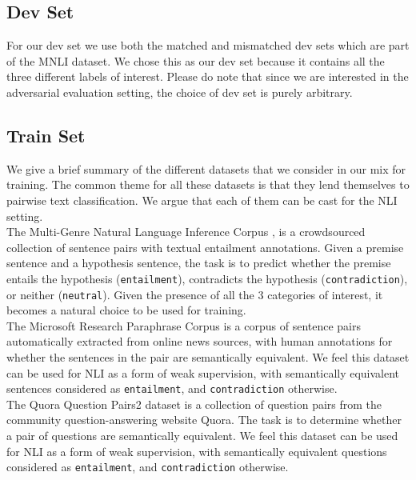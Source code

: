 \subsection{Dev Set}
\label{subsec:devset}

For our dev set we use both the matched and mismatched dev sets which are part of the MNLI dataset. We chose this as our dev set because it contains all the three different labels of interest. Please do note that since we are interested in the adversarial evaluation setting, the choice of dev set is purely arbitrary. 

\subsection{Train Set}
\label{subsec:trainset}

We give a brief summary of the different datasets that we consider in our mix for training. The common theme for all these datasets is that they lend themselves to pairwise text classification. We argue that each of them can be cast for the NLI setting. \\

  The Multi-Genre Natural Language Inference Corpus \cite{N18-1101}, is a crowdsourced collection of sentence pairs with textual entailment annotations. Given a premise sentence and a hypothesis sentence, the task is to predict whether the premise entails the hypothesis (\texttt{entailment}), contradicts the hypothesis (\texttt{contradiction}), or neither (\texttt{neutral}). Given the presence of all the 3 categories of interest, it becomes a natural choice to be used for training. \\

 The Microsoft Research Paraphrase Corpus \cite{dolan-brockett-2005-automatically} is a corpus of sentence pairs automatically extracted from online news sources, with human annotations for whether the sentences in the pair are semantically equivalent. We feel this dataset can be used for NLI as a form of weak supervision, with semantically equivalent sentences considered as \texttt{entailment}, and \texttt{contradiction} otherwise. \\

 The Quora Question Pairs2  \cite{WinNT} dataset is a collection of question pairs from the community question-answering website Quora. The task is to determine whether a pair of questions are semantically equivalent. We feel this dataset can be used for NLI as a form of weak supervision, with semantically equivalent questions considered as \texttt{entailment}, and \texttt{contradiction} otherwise. \\

